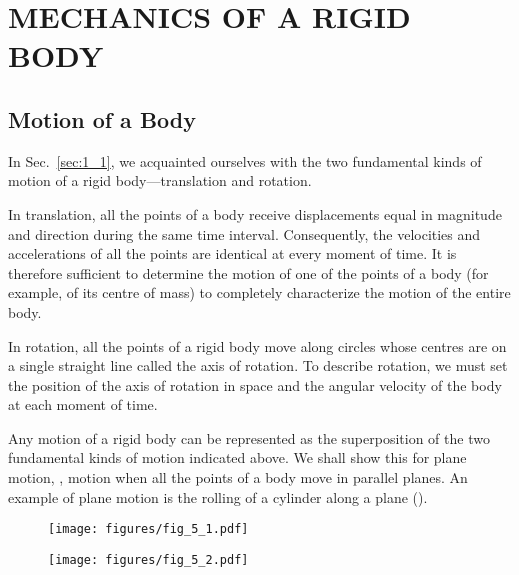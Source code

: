 

\chapter{MECHANICS OF A RIGID BODY}\label{chap:5}

\section{Motion of a Body}\label{sec:5_1}

In Sec.~\ref{sec:1_1}, we acquainted ourselves with the two fundamental kinds of motion of a rigid body---translation and rotation.

In translation, all the points of a body receive displacements equal in magnitude and direction during the same time interval. Consequently, the velocities and accelerations of all the points are identical at every moment of time. It is therefore sufficient to determine the motion of one of the points of a body (for example, of its centre of mass) to completely characterize the motion of the entire body.

In rotation, all the points of a rigid body move along circles whose centres are on a single straight line called the axis of rotation. To describe rotation, we must set the position of the axis of rotation in space and the angular velocity of the body at each moment of time.

Any motion of a rigid body can be represented as the superposition of the two fundamental kinds of motion indicated above. We shall show this for plane motion, \ie, motion when all the points of a body move in parallel planes. An example of plane motion is the rolling of a cylinder along a plane ().

\begin{figure}[t]
	\begin{minipage}[t]{0.5\linewidth}
		\begin{center}
			\texttt{[image: figures/fig\_5\_1.pdf]}
			\caption[]{}
			\label{fig:5_1}
		\end{center}
	\end{minipage}
	\hspace{-0.05cm}
	\begin{minipage}[t]{0.5\linewidth}
		\begin{center}
			\texttt{[image: figures/fig\_5\_2.pdf]}
			\caption[]{}
			\label{fig:5_2}
		\end{center}
	\end{minipage}
\vspace{-0.7cm}
\end{figure}

